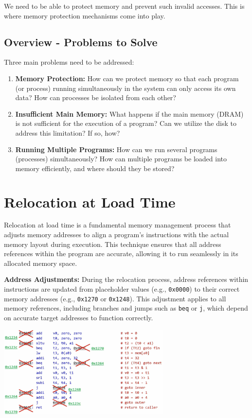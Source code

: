 We need to be able to protect memory and prevent such invalid accesses. This is where memory protection mechanisms come into play.

\subsection{Overview - Problems to Solve}
Three main problems need to be addressed:

\begin{enumerate}
    \item \textbf{Memory Protection:} How can we protect memory so that each program (or process) running simultaneously in the system can only access its own data? How can processes be isolated from each other?
    \item \textbf{Insufficient Main Memory:} What happens if the main memory (DRAM) is not sufficient for the execution of a program? Can we utilize the disk to address this limitation? If so, how?
    \item \textbf{Running Multiple Programs:} How can we run several programs (processes) simultaneously? How can multiple programs be loaded into memory efficiently, and where should they be stored?
\end{enumerate}

\section{Relocation at Load Time}

Relocation at load time is a fundamental memory management process that adjusts memory addresses to align a program’s instructions with the actual memory layout during execution. This technique ensures that all address references within the program are accurate, allowing it to run seamlessly in its allocated memory space.

\textbf{Address Adjustments:} During the relocation process, address references within instructions are updated from placeholder values (e.g., \texttt{0x0000}) to their correct memory addresses (e.g., \texttt{0x1270} or \texttt{0x1248}). This adjustment applies to all memory references, including branches and jumps such as \texttt{beq} or \texttt{j}, which depend on accurate target addresses to function correctly.
\begin{center}
    \includegraphics[width=0.65\textwidth]{chapters/chapter3c/images/relocate.png}
\end{center}


